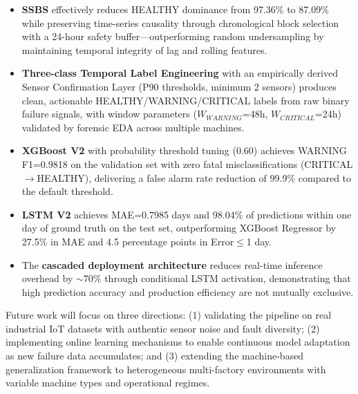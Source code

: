 \documentclass[conference]{IEEEtran}
\begin{document}
\begin{itemize}
\item \textbf{SSBS} effectively reduces HEALTHY dominance from 97.36\% to 87.09\% while preserving time-series causality through chronological block selection with a 24-hour safety buffer—outperforming random undersampling by maintaining temporal integrity of lag and rolling features.

\item \textbf{Three-class Temporal Label Engineering} with an empirically derived Sensor Confirmation Layer (P90 thresholds, minimum 2 sensors) produces clean, actionable HEALTHY/WARNING/CRITICAL labels from raw binary failure signals, with window parameters ($W_{WARNING}$=48h, $W_{CRITICAL}$=24h) validated by forensic EDA across multiple machines.

\item \textbf{XGBoost V2} with probability threshold tuning (0.60) achieves WARNING F1=0.9818 on the validation set with zero fatal misclassifications (CRITICAL$\rightarrow$HEALTHY), delivering a false alarm rate reduction of 99.9\% compared to the default threshold.

\item \textbf{LSTM V2} achieves MAE=0.7985 days and 98.04\% of predictions within one day of ground truth on the test set, outperforming XGBoost Regressor by 27.5\% in MAE and 4.5 percentage points in Error$\leq$1 day.

\item The \textbf{cascaded deployment architecture} reduces real-time inference overhead by $\sim$70\% through conditional LSTM activation, demonstrating that high prediction accuracy and production efficiency are not mutually exclusive.
\end{itemize}

Future work will focus on three directions: (1) validating the pipeline on real industrial IoT datasets with authentic sensor noise and fault diversity; (2) implementing online learning mechanisms to enable continuous model adaptation as new failure data accumulates; and (3) extending the machine-based generalization framework to heterogeneous multi-factory environments with variable machine types and operational regimes.

\end{document}
